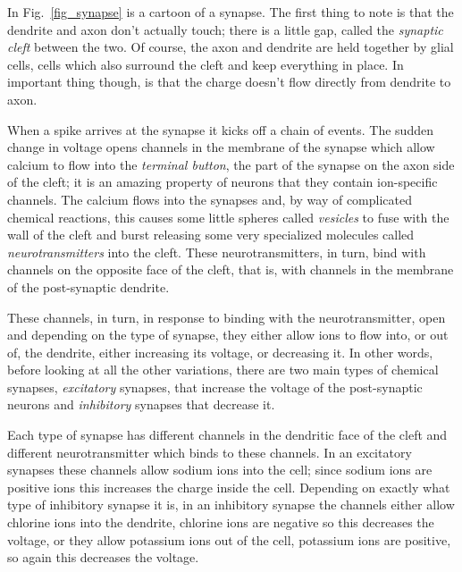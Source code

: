 \documentclass[12pt]{article}
\begin{document}
In Fig.~\ref{fig_synapse} is a cartoon of a synapse. The first thing
to note is that the dendrite and axon don't actually touch; there is a
little gap, called the \textsl{synaptic cleft} between the two. Of
course, the axon and dendrite are held together by glial cells, cells
which also surround the cleft and keep everything in place. In
important thing though, is that the charge doesn't flow directly from dendrite to axon.

When a spike arrives at the synapse it kicks off a chain of
events. The sudden change in voltage opens channels in the membrane of
the synapse which allow calcium to flow into the \textsl{terminal button}, the part of the synapse on the axon side of the cleft; it is an
amazing property of neurons that they contain ion-specific
channels. The calcium flows into the synapses and, by way of
complicated chemical reactions, this causes some little spheres called
\textsl{vesicles} to fuse with the wall of the cleft and burst
releasing some very specialized molecules called
\textsl{neurotransmitters} into the cleft. These neurotransmitters, in
turn, bind with channels on the opposite face of the cleft, that is,
with channels in the membrane of the post-synaptic dendrite.

These channels, in turn, in response to binding with the
neurotransmitter, open and depending on the type of synapse, they
either allow ions to flow into, or out of, the dendrite, either
increasing its voltage, or decreasing it. In other words, before
looking at all the other variations, there are two main types of
chemical synapses, \textsl{excitatory} synapses, that increase the
voltage of the post-synaptic neurons and \textsl{inhibitory} synapses
that decrease it.

Each type of synapse has different channels in the dendritic face of
the cleft and different neurotransmitter which binds to these
channels. In an excitatory synapses these channels allow sodium ions
into the cell; since sodium ions are positive ions this increases the
charge inside the cell. Depending on exactly what type of inhibitory
synapse it is, in an inhibitory synapse the channels either allow
chlorine ions into the dendrite, chlorine ions are negative so this
decreases the voltage, or they allow potassium ions out of the cell,
potassium ions are positive, so again this decreases the voltage.
\end{document}
